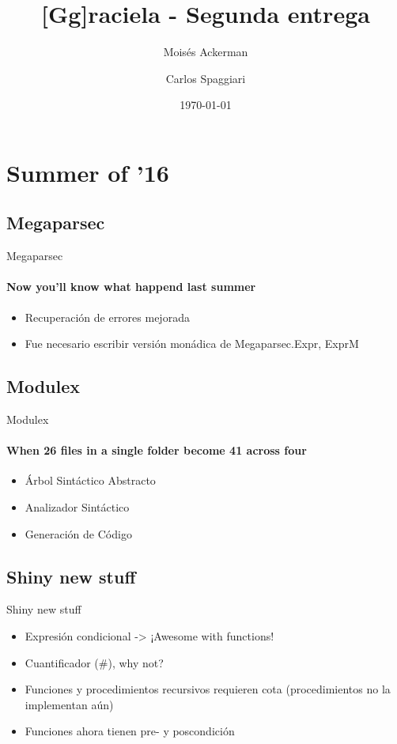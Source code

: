\documentclass{beamer}
\title[Graciela]{[Gg]raciela - Segunda entrega}
\author[Ackerman - Spaggiari]{Moisés Ackerman \and Carlos Spaggiari}
\institute[USB]{Universidad Simón Bolívar}
\date{\today{}}
\begin{document}
\begin{frame}
  \titlepage
\end{frame}

\section{Summer of '16}

\subsection{Megaparsec}
\begin{frame}{Megaparsec}
\framesubtitle{Now you'll know what happend last summer}
\begin{itemize}
  \item Recuperación de errores mejorada
  \item Fue necesario escribir versión monádica de Megaparsec.Expr, ExprM
\end{itemize}
\end{frame}

\subsection{Modulex}
\begin{frame}{Modulex}
\framesubtitle{When 26 files in a single folder become 41 across four}
\begin{itemize}
  \item Árbol Sintáctico Abstracto
  \item Analizador Sintáctico
  \item Generación de Código
\end{itemize}
\end{frame}

\subsection{Shiny new stuff}
\begin{frame}{Shiny new stuff}
\begin{itemize}
  \item Expresión condicional -> ¡Awesome with functions!
  \item Cuantificador (\#), why not?
  \item Funciones y procedimientos recursivos requieren cota (procedimientos no la implementan aún)
  \item Funciones ahora tienen pre- y poscondición
\end{itemize}
\end{frame}
\end{document}
